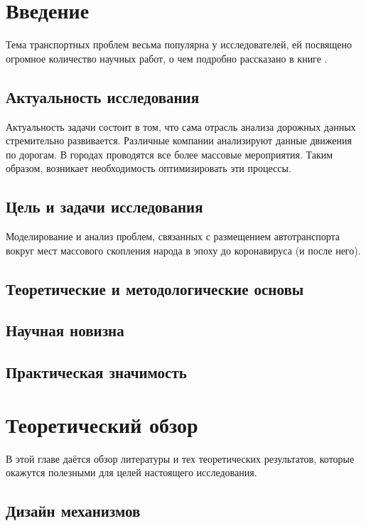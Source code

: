 \chapter{Введение}
 
Тема транспортных проблем весьма популярна у исследователей, ей посвящено
огромное количество научных работ, о чем подробно рассказано в книге \cite{gas}.
 
\section{Актуальность исследования}
 
Актуальность задачи состоит в том, что сама отрасль анализа дорожных данных
стремительно развивается. Различные компании анализируют данные движения
по дорогам. В городах проводятся все более массовые мероприятия. Таким
образом, возникает необходимость оптимизировать эти процессы.
 
\section{Цель и задачи исследования}
Моделирование и анализ проблем, связанных с размещением автотранспорта
вокруг мест массового скопления народа в эпоху до коронавируса (и после него).
 
\section{Теоретические и методологические основы}
\section{Научная новизна}
\section{Практическая значимость}
 
\chapter{Теоретический обзор}
 
В этой главе даётся обзор литературы и тех теоретических результатов,
которые окажутся полезными для целей настоящего исследования.
 
\section{Дизайн механизмов}
 
